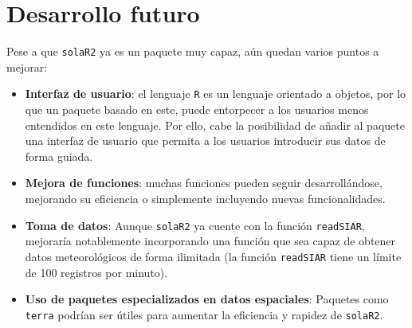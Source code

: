 \FloatBarrier

\section{Desarrollo futuro}
\label{sec:org0d649d8}
Pese a que \texttt{solaR2} ya es un paquete muy capaz, aún quedan varios puntos a mejorar:
\begin{itemize}
\item \textbf{Interfaz de usuario}: el lenguaje \texttt{R} es un lenguaje orientado a objetos, por lo que un paquete basado en este, puede entorpecer a los usuarios menos entendidos en este lenguaje. Por ello, cabe la posibilidad de añadir al paquete una interfaz de usuario que permita a los usuarios introducir sus datos de forma guiada.
\item \textbf{Mejora de funciones}: muchas funciones pueden seguir desarrollándose, mejorando su eficiencia o simplemente incluyendo nuevas funcionalidades.
\item \textbf{Toma de datos}: Aunque \texttt{solaR2} ya cuente con la función \texttt{readSIAR}, mejoraría notablemente incorporando una función que sea capaz de obtener datos meteorológicos de forma ilimitada (la función \texttt{readSIAR} tiene un límite de 100 registros por minuto).
\item \textbf{Uso de paquetes especializados en datos espaciales}: Paquetes como \texttt{terra} \cite{hijmans24} podrían ser útiles para aumentar la eficiencia y rapidez de \texttt{solaR2}.
\end{itemize}
